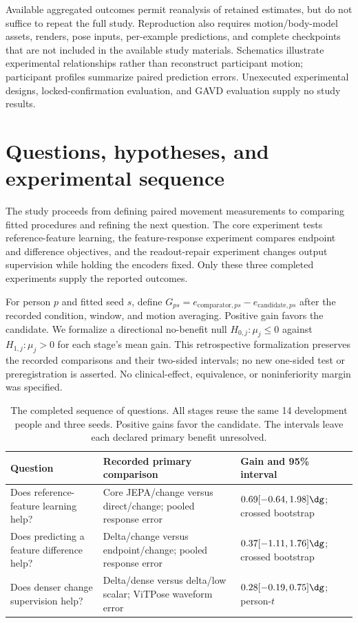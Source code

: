 Available aggregated outcomes permit reanalysis of retained estimates, but do not suffice to repeat the full study. Reproduction also requires motion/body-model assets, renders, pose inputs, per-example predictions, and complete checkpoints that are not included in the available study materials. Schematics illustrate experimental relationships rather than reconstruct participant motion; participant profiles summarize paired prediction errors. Unexecuted experimental designs, locked-confirmation evaluation, and GAVD evaluation supply no study results.


\clearpage
\section{Questions, hypotheses, and experimental sequence}
\label{app:journey}
The study proceeds from defining paired movement measurements to comparing fitted procedures and refining the next question. The core experiment tests reference-feature learning, the feature-response experiment compares endpoint and difference objectives, and the readout-repair experiment changes output supervision while holding the encoders fixed. Only these three completed experiments supply the reported outcomes.

For person $p$ and fitted seed $s$, define $G_{ps}=e_{\mathrm{comparator},ps}-e_{\mathrm{candidate},ps}$ after the recorded condition, window, and motion averaging. Positive gain favors the candidate. We formalize a directional no-benefit null $H_{0,j}:\mu_j\leq0$ against $H_{1,j}:\mu_j>0$ for each stage's mean gain. This retrospective formalization preserves the recorded comparisons and their two-sided intervals; no new one-sided test or preregistration is asserted. No clinical-effect, equivalence, or noninferiority margin was specified.

\begin{table}[h]\centering\small
\caption{The completed sequence of questions. All stages reuse the same 14 development people and three seeds. Positive gains favor the candidate. The intervals leave each declared primary benefit unresolved.}
\label{tab:journey}
\begin{tabular}{>{\raggedright\arraybackslash}p{1.03in}>{\raggedright\arraybackslash}p{2.48in}>{\raggedright\arraybackslash}p{1.38in}}\toprule
Question & Recorded primary comparison & Gain and 95\% interval \\\midrule
Does reference-feature learning help? & Core JEPA/change versus direct/change; pooled response error & $0.69[-0.64,1.98]\dg$; crossed bootstrap \\
Does predicting a feature difference help? & Delta/change versus endpoint/change; pooled response error & $0.37[-1.11,1.76]\dg$; crossed bootstrap \\
Does denser change supervision help? & Delta/dense versus delta/low scalar; ViTPose waveform error & $0.28[-0.19,0.75]\dg$; person-$t$ \\\bottomrule
\end{tabular}
\end{table}

